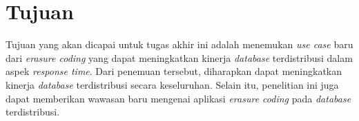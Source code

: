 \section{Tujuan}

Tujuan yang akan dicapai untuk tugas akhir ini adalah menemukan \textit{use case} baru dari \textit{erasure coding} yang dapat meningkatkan kinerja \textit{database} terdistribusi dalam aspek \textit{response time}. Dari penemuan tersebut, diharapkan dapat meningkatkan kinerja \textit{database} terdistribusi secara keseluruhan. Selain itu, penelitian ini juga dapat memberikan wawasan baru mengenai aplikasi \textit{erasure coding} pada \textit{database} terdistribusi.
